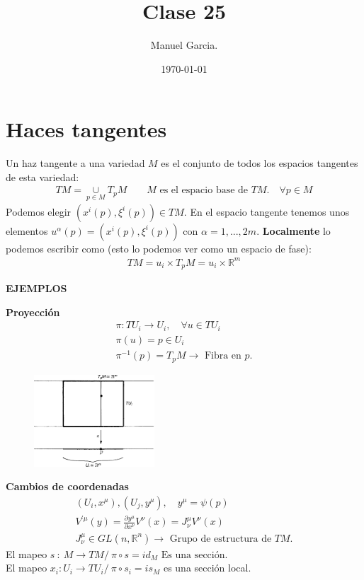 \documentclass{article}
\title{Clase 25 }
\author{Manuel Garcia.}
\date{\today}
\begin{document}
\maketitle

\section{Haces tangentes }
Un haz tangente a una variedad $ M  $ es el conjunto de todos los espacios tangentes de esta variedad: 
\begin{gather*}
  TM = \underset{p\in M }{\cup}T_p M  \qquad M \text{ es el espacio base de }TM. \quad \forall p \in M 
\end{gather*}
Podemos elegir $ (x ^ {i }(p) , \xi ^ {i }(p) ) \in TM$. En el espacio tangente tenemos unos elementos $ u ^ {\alpha}(p) = (x ^ {i }(p), \xi ^ {i }(p)) $ con $ \alpha = 1,...,2m  $. \textbf{Localmente} lo podemos escribir como (esto lo podemos ver como un espacio de fase): 
\begin{gather*}
  TM = u_i \times T_pM = u_i \times \mathbb{R}^ {m } 
\end{gather*}

\textbf{EJEMPLOS}

\textbf{Proyección }
\begin{gather*}
  \pi : TU _{i } \rightarrow U _{i } ,\quad \forall u \in T U_i \\
  \pi(u) = p \in U_i \\
  \pi ^ {-1 }(p) = T_p M \rightarrow \text{ Fibra en }p .
\end{gather*}
\begin{figure}[H]
  \begin{center}
    \includegraphics[width=0.4\textwidth]{proyeccion.png}
  \end{center}
\end{figure}
\textbf{Cambios de coordenadas }
\begin{gather*}
  (U_i,x ^ {\mu }), (U_j,y ^ {\mu }), \quad y ^ {\mu }= \psi(p) \\
  V ^ {'\mu }(y) = \frac{\partial y ^ {\mu } }{\partial x ^ {\nu }}V ^ {\nu }(x) = J _{\nu } ^ {\mu } V ^ {\nu }(x) \\
  J _{\nu } ^ {\mu } \in GL(n, \mathbb{R}^ {n }) \rightarrow \text{ Grupo de estructura de }TM. 
\end{gather*}
El mapeo $ s\ : \ M \rightarrow TM/ \ \pi \circ s = id_M \text{ Es una sección. } $\\
El mapeo $ x_i : U_i \rightarrow TU_i / \ \pi \circ s_i = is_M $ es una sección local.
\end{document}

